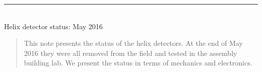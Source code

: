 \documentclass[twoside, final, 11pt]{articleMine}
\begin{document}
\modulolinenumbers[2]



\renewcommand\linenumberfont{\small\rmfamily}
\begin{center}
  \vspace*{-13ex}

  \rule{\linewidth}{0.1mm}  \\[17mm] {\huge  Helix detector status: May 2016}
     \begin{flushright}
       \small 
     
     \end{flushright}

\end{center}
% 
\vspace*{2ex} 
%
\thispagestyle{empty}
\noindent
\begin{abstract}
  \noindent
This note  presents the status of  the helix detectors. At  the end of
May  2016 they  were all  removed  from the  field and  tested in  the
assembly building  lab.  We present  the status in terms  of mechanics
and electronics.
\end{abstract}

%
\thispagestyle{empty}
\noindent







\end{document}
